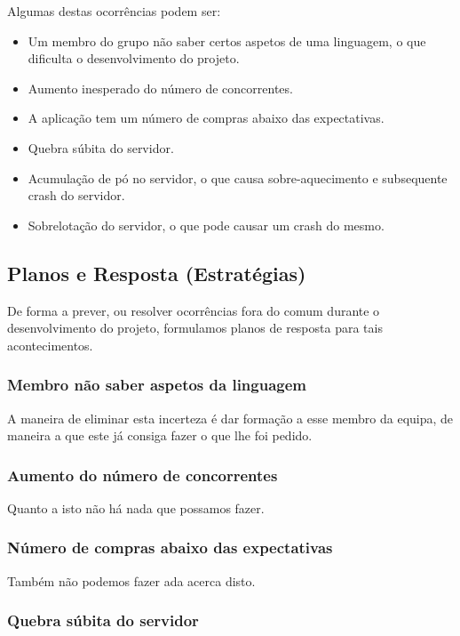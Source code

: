 \documentclass[a4paper]{article}
\begin{document}
\noindent Algumas destas ocorrências podem ser:
\begin{itemize}
\item Um membro do grupo não saber certos aspetos de uma linguagem, o que dificulta o desenvolvimento do projeto.
\item Aumento inesperado do número de concorrentes.
\item A aplicação tem um número de compras abaixo das expectativas.
\item Quebra súbita do servidor.
\item Acumulação de pó no servidor, o que causa sobre-aquecimento e subsequente crash do servidor.
\item Sobrelotação do servidor, o que pode causar um crash do mesmo.
\end{itemize}

\subsection{Planos e Resposta (Estratégias)}
De forma a prever, ou resolver ocorrências fora do comum durante o desenvolvimento do projeto, formulamos planos de resposta para tais acontecimentos.\\ 

\subsubsection{Membro não saber aspetos da linguagem}

A maneira de eliminar esta incerteza é dar formação a esse membro da equipa, de maneira a que este já consiga fazer o que lhe foi pedido.

\subsubsection{Aumento do número de concorrentes}

Quanto a isto não há nada que possamos fazer.

\subsubsection{Número de compras abaixo das expectativas}

Também não podemos fazer ada acerca disto.

\subsubsection{Quebra súbita do servidor}
\end{document}
